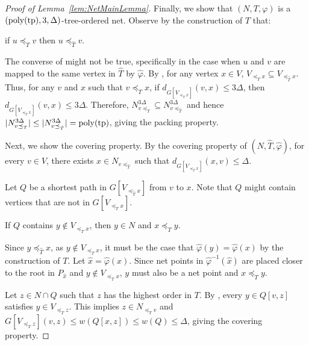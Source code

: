 \documentclass{theoretics}
\newcommand{\tp}{{\rm tp}}
\newcommand{\poly}{\mathrm{poly}}
\begin{document}
\begin{proof}[Proof of Lemma~\ref{lem:NetMainLemma}]
Finally, we show that $(N,T,\varphi)$ is a $(\poly(\tp),3,\Delta)$-tree-ordered net. Observe by the construction of $T$ that:

\begin{observation}\label{obs:T-order} if $u\preceq_T v$ then $u\preceq_{\hat{T}}v$.
\end{observation}

The converse of  might not be true, specifically in the case when $u$ and $v$ are mapped to the same vertex in $\hat{T}$ by $\hat{\varphi}$.  By , for any vertex $x \in V$, $V_{\preceq_T x}\subseteq V_{\preceq_{\hat{T}}x}$. Thus, for any $v$ and $x$ such that $v\preceq_{T}x$, if  $d_{G[V_{\preceq_{T} x}]}(v,x) \leq 3\Delta$, then $d_{G[V_{\preceq_{\hat{T}} x}]}(v,x) \leq 3\Delta$. Therefore, $N^{3\Delta}_{v\preceq_T }\subseteq N^{3\Delta}_{v\preceq_{\hat{T}}}$ and hence $|N^{3\Delta}_{v\preceq_T }| \leq | N^{3\Delta}_{v\preceq_{\hat{T}}}| = \poly(\tp)$, giving the packing property.

Next, we show the covering property. By the covering property of $(N,\hat{T},\hat{\varphi})$, for every $v\in V$, there exists $x\in N_{v\preceq_{\hat{T}}}$ such that $d_{G[V_{\preceq_{\hat{T}} x}]}(x,v)\leq \Delta$.

Let $Q$ be a shortest path in $G[V_{\preceq_{\hat{T}} x}]$ from $v$ to $x$. Note that $Q$ might contain vertices that are not in  $G[V_{\preceq_{T} x}]$. 

\begin{claim}\label{clm:net-close} If $Q$ contains $y \not\in V_{\preceq_{T} x}$, then $y \in N$ and $x\preceq_T y$.
\end{claim}
\begin{subproof}
    Since $y \preceq_{\hat{T}}x$, as $y \not\in V_{\preceq_{T} x}$, it must be the case that $\hat{\varphi}(y) = \hat{\varphi}(x)$ by the construction of $T$. Let $\hat{x} = \hat{\varphi}(x)$. Since net points in $\hat{\varphi}^{-1}(\hat{x})$ are placed closer to the root in $P_{\hat{x}}$ and $y\not\in V_{\preceq_{T} x}$, $y$ must also be a net point and $x\preceq_T y$.
\end{subproof}

Let $z \in N\cap Q$ such that $z$ has the highest order in $T$. By  , every $y \in Q[v,z]$ satisfies $y \in  V_{\preceq_{T} z} $. This implies $z\in N_{\preceq_T v}$  and $G[V_{\preceq_{T} z}](v,z) \leq w(Q[x,z])\leq w(Q) \leq \Delta$, giving the covering property. 
\end{proof}
\end{document}
